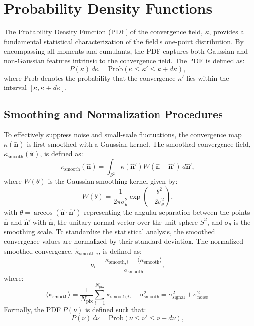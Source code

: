 \section{Probability Density Functions} \label{sec:pdfs}
The Probability Density Function (PDF) of the convergence field, $\kappa$, provides a fundamental statistical characterization of the field's one-point distribution. By encompassing all moments and cumulants, the PDF captures both Gaussian and non-Gaussian features intrinsic to the convergence field. The PDF is defined as:
\begin{equation}
    P(\kappa) \, d\kappa = \mathrm{Prob}(\kappa \leq \kappa' \leq \kappa + d\kappa),
\end{equation}
where \(\mathrm{Prob}\) denotes the probability that the convergence \(\kappa'\) lies within the interval \([\kappa, \kappa + d\kappa]\).

\subsection{Smoothing and Normalization Procedures}
To effectively suppress noise and small-scale fluctuations, the convergence map $\kappa(\hat{\mathbf{n}})$ is first smoothed with a Gaussian kernel. The smoothed convergence field, $\kappa_{\mathrm{smooth}}(\hat{\mathbf{n}})$, is defined as:
\begin{equation}
    \kappa_{\mathrm{smooth}}(\hat{\mathbf{n}}) = \int_{S^2} \kappa(\hat{\mathbf{n}}') W(\hat{\mathbf{n}} - \hat{\mathbf{n}}') \, d\hat{\mathbf{n}}',
    \label{eq:smoothing}
\end{equation}
where $W(\theta)$ is the Gaussian smoothing kernel given by:
\begin{equation}
    W(\theta) = \frac{1}{2\pi \sigma_{\theta}^2} \exp\left( -\frac{\theta^2}{2 \sigma_{\theta}^2} \right),
    \label{eq:gaussian_kernel}
\end{equation}
with $\theta = \arccos(\hat{\mathbf{n}} \cdot \hat{\mathbf{n}}')$ representing the angular separation between the points $\hat{\mathbf{n}}$ and $\hat{\mathbf{n}}'$ with $\hat{\mathbf{n}}$, the unitary normal vector over the unit sphere $S^2$, and $\sigma_{\theta}$ is the smoothing scale. To standardize the statistical analysis, the smoothed convergence values are normalized by their standard deviation. The normalized smoothed convergence, $\tilde{\kappa}_{\mathrm{smooth}, i}$, is defined as:
\begin{equation}
    \nu_{i} = \frac{\kappa_{\mathrm{smooth}, i} - \langle \kappa_{\mathrm{smooth}} \rangle}{\sigma_{\mathrm{smooth}}},
    \label{eq:kappa_smooth_normalized}
\end{equation}
where:
\begin{equation}
    \langle \kappa_{\mathrm{smooth}} \rangle = \frac{1}{N_{\mathrm{pix}}} \sum_{i=1}^{N_{\mathrm{pix}}} \kappa_{\mathrm{smooth}, i}, \quad \sigma_{\mathrm{smooth}}^2 = \sigma_{\mathrm{signal}}^2 + \sigma_{\mathrm{noise}}^2.
    \label{eq:normalization}
\end{equation}
Formally, the PDF \( P(\nu) \) is defined such that:
\begin{equation}
    P(\nu) \, d\nu = \mathrm{Prob}(\nu \leq \nu' \leq \nu + d\nu),
\end{equation}

